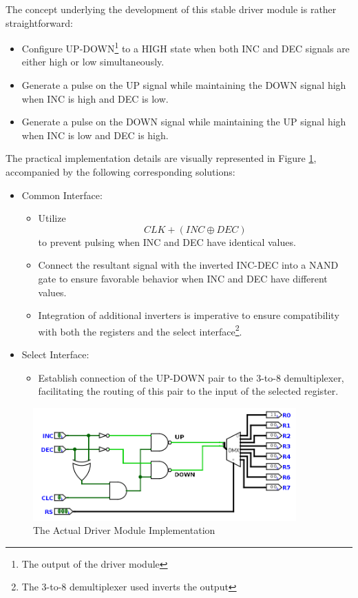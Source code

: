 The concept underlying the development of this stable driver module is rather straightforward:
\begin{itemize}
	\item Configure UP-DOWN\footnote{The output of the driver module} to a HIGH state when both INC and DEC signals are either high or low simultaneously.
	\item Generate a pulse on the UP signal while maintaining the DOWN signal high when INC is high and DEC is low.
	\item Generate a pulse on the DOWN signal while maintaining the UP signal high when INC is low and DEC is high.
\end{itemize}

The practical implementation details are visually represented in Figure \ref{fig:actual_driver_module_implementation}, accompanied by the following corresponding solutions:

\begin{itemize}
	\item Common Interface:
	\begin{itemize}
		\item Utilize $$CLK + (INC \oplus DEC)$$ to prevent pulsing when INC and DEC have identical values.
		\item Connect the resultant signal with the inverted INC-DEC into a NAND gate to ensure favorable behavior when INC and DEC have different values.
		\item Integration of additional inverters is imperative to ensure compatibility with both the registers and the select interface\footnote{The 3-to-8 demultiplexer used inverts the output}.
	\end{itemize}
	\item Select Interface:
	\begin{itemize}
		\item Establish connection of the UP-DOWN pair to the 3-to-8 demultiplexer, facilitating the routing of this pair to the input of the selected register.
	\end{itemize}
\end{itemize}


\begin{figure}[H]
	\centering
	\includegraphics[width=0.9\textwidth]{img/actual_driver_module_implementation}
	\caption{The Actual Driver Module Implementation}
	\label{fig:actual_driver_module_implementation}
\end{figure}



